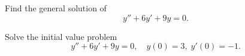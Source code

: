 \setcounter{example}{1}
\setcounter{equation}{7}
\begin{example}
  \label{example:5.2.2}\rm \mbox{}
  \newline
  \begin{alist}
    \item %
    Find the general solution of
    \begin{equation}
      \label{eq:5.2.8}y''+6y'+9y=0.
    \end{equation}

    \item %
    Solve the initial value problem
    \begin{equation}
      \label{eq:5.2.9}y''+6y'+9y=0,\quad y(0)=3,\;y'(0)=-1.
    \end{equation}
  \end{alist}
\end{example}
\setcounter{equation}{9}
\setcounter{figure}{1}
